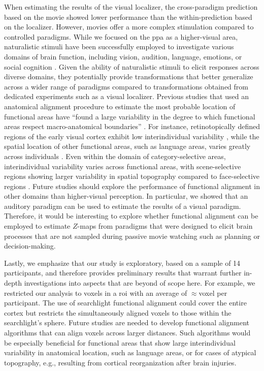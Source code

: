 %
When estimating the results of the visual localizer, the cross-paradigm
prediction based on the movie showed lower performance than the
within-prediction based on the localizer.
%
However, movies offer a more complex stimulation compared to controlled
paradigms.
%
While we focused on the \ac{ppa} as a higher-visual area, naturalistic stimuli
have been successfully employed to investigate various domains of brain
function, including vision, audition, language, emotions, or social cognition
\citep[s.][for a review]{jaaskelainen2021movies}.
%
Given the ability of naturalistic stimuli to elicit responses across diverse
domains, they potentially provide transformations that better generalize across
a wider range of paradigms compared to transformations obtained from dedicated
experiments such as a visual localizer.
%
Previous studies that used an anatomical alignment procedure to estimate the
most probable location of functional areas have ``found a large variability in
the degree to which functional areas respect macro-anatomical boundaries''
\citep[][p. 1369]{frost2012measuring}.
%
For instance, retinotopically defined regions of the early visual cortex exhibit
low interindividual variability \citep{rosenke2021probabilistic}, while the
spatial location of other functional areas, such as language areas, varies
greatly across individuals \citep{frost2012measuring}.
%
Even within the domain of category-selective areas, interindividual variability
varies across functional areas, with scene-selective regions showing larger
variability in spatial topography compared to face-selective regions
\citep{zhen2015quantifying, zhen2017quantifying, frost2012measuring}.
%
Future studies should explore the performance of functional alignment in other
domains than higher-visual perception.
%
In particular, we showed that an auditory paradigm can be used to estimate the
results of a visual paradigm.
%
Therefore, it would be interesting to explore whether functional alignment can
be employed to estimate $Z$-maps from paradigms that were designed to elicit
brain processes that are not sampled during passive movie watching such as
planning or decision-making.

%
Lastly, we emphasize that our study is exploratory, based on a sample of 14
participants, and therefore provides preliminary results that warrant further
in-depth investigations into aspects that are beyond of scope here.
%
For example, we restricted our analysis to voxels in a \ac{roi} with an average
of $\approx$\unit[1600]{voxel} per participant.
%
The use of searchlight functional alignment
\citep[e.g.,][]{zhang2016searchlight, guntupalli2016model} could cover the
entire cortex but restricts the simultaneously aligned voxels to those within
the searchlight's sphere.
%
Future studies are needed to develop functional alignment algorithms that can
align voxels across larger distances.
%
Such algorithms would be especially beneficial for functional areas that show
large interindividual variability in anatomical location, such as language
areas, or for cases of atypical topography, e.g., resulting from cortical
reorganization after brain injuries.

